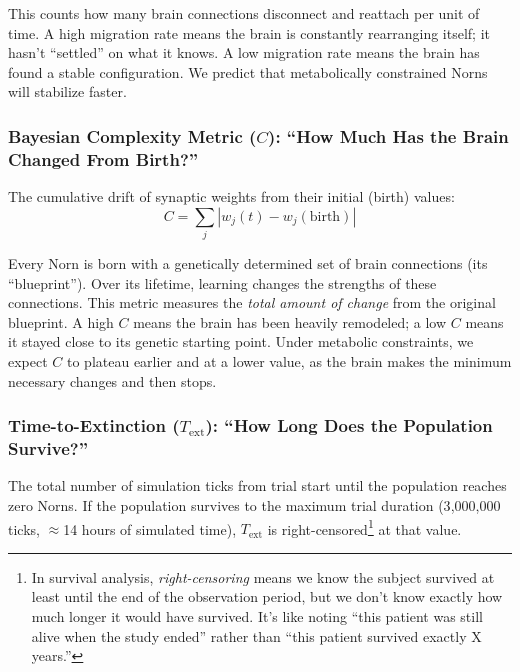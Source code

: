 \documentclass[12pt, a4paper]{article}
\begin{document}
\begin{plainbox}
This counts how many brain connections disconnect and reattach per unit of time. A high migration rate means the brain is constantly rearranging itself; it hasn't ``settled'' on what it knows. A low migration rate means the brain has found a stable configuration. We predict that metabolically constrained Norns will stabilize faster.
\end{plainbox}

\subsubsection{Bayesian Complexity Metric ($C$): ``How Much Has the Brain Changed From Birth?''}
The cumulative drift of synaptic weights from their initial (birth) values:
\begin{equation}
  C = \sum_{j} |w_j(t) - w_j(\text{birth})|
  \label{eq:complexity}
\end{equation}

\begin{plainbox}
Every Norn is born with a genetically determined set of brain connections (its ``blueprint''). Over its lifetime, learning changes the strengths of these connections. This metric measures the \emph{total amount of change} from the original blueprint. A high $C$ means the brain has been heavily remodeled; a low $C$ means it stayed close to its genetic starting point. Under metabolic constraints, we expect $C$ to plateau earlier and at a lower value, as the brain makes the minimum necessary changes and then stops.
\end{plainbox}

\subsubsection{Time-to-Extinction ($T_{\text{ext}}$): ``How Long Does the Population Survive?''}
The total number of simulation ticks from trial start until the population reaches zero Norns. If the population survives to the maximum trial duration (3{,}000{,}000 ticks, $\approx$14 hours of simulated time), $T_{\text{ext}}$ is right-censored\footnote{In survival analysis, \emph{right-censoring} means we know the subject survived at least until the end of the observation period, but we don't know exactly how much longer it would have survived. It's like noting ``this patient was still alive when the study ended'' rather than ``this patient survived exactly X years.''} at that value.
\end{document}

